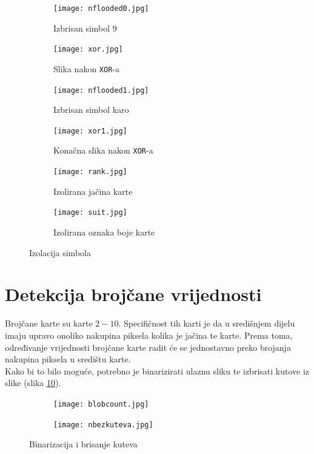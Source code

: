 \documentclass[times, zavrsni, numeric, utf8]{fer}
\newcommand{\code}[1]{\texttt{#1}}
\begin{document}
\begin{figure}[H]
\begin{subfigure}{.5\textwidth}
  \centering
  \texttt{[image: nflooded0.jpg]}
  \caption{Izbrisan simbol $9$}
  \label{fig:fl90}
\end{subfigure}%
\begin{subfigure}{.5\textwidth}
  \centering
  \texttt{[image: xor.jpg]}
  \caption{Slika nakon \code{XOR}-a}
  \label{fig:xor90}
\end{subfigure}
\begin{subfigure}{.5\textwidth}
  \centering
  \texttt{[image: nflooded1.jpg]}
  \caption{Izbrisan simbol karo}
  \label{fig:fl91}
\end{subfigure}%
\begin{subfigure}{.5\textwidth}
  \centering
  \texttt{[image: xor1.jpg]}
  \caption{Konačna slika nakon \code{XOR}-a}
  \label{fig:xor91}
\end{subfigure}
\begin{subfigure}{.5\textwidth}
  \centering
  \texttt{[image: rank.jpg]}
  \caption{Izolirana jačina karte}
  \label{fig:rank}
\end{subfigure}%
\begin{subfigure}{.5\textwidth}
  \centering
  \texttt{[image: suit.jpg]}
  \caption{Izolirana oznaka boje karte}
  \label{fig:suit}
\end{subfigure}
\caption{Izolacija simbola}
\label{fig:blobs}
\end{figure}

\section{Detekcija brojčane vrijednosti}
\label{schap:detval}
\hspace*{0.5cm}Brojčane karte su karte $2 - 10$. Specifičnost tih karti je da u središnjem dijelu imaju upravo onoliko nakupina piksela kolika je jačina te karte. Prema toma, određivanje vrijednosti brojčane karte radit će se jednostavno preko brojanja nakupina piksela u središtu karte.\\
Kako bi to bilo moguće, potrebno je binarizirati ulaznu sliku te izbrisati kutove iz slike (slika \ref{fig:bindel}).
\begin{figure}[H]
\begin{subfigure}{.5\textwidth}
  \centering
  \texttt{[image: blobcount.jpg]}
  \caption{}
  \label{fig:blcnt}
\end{subfigure}%
\begin{subfigure}{.5\textwidth}
  \centering
  \texttt{[image: nbezkuteva.jpg]}
  \caption{}
  \label{fig:binary}
\end{subfigure}
\caption{Binarizacija i brisanje kuteva}
\label{fig:bindel}
\end{figure}
\end{document}
